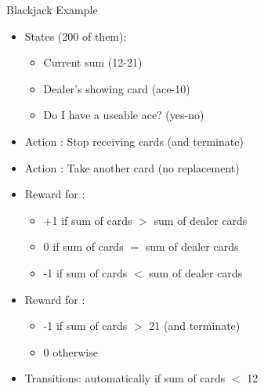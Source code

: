 \bgroup
\begin{frame}{Blackjack Example}
\begin{minipage}{0.7\textwidth}
\begin{itemize}
\item States (200 of them):
\begin{itemize}
\item Current sum (12-21)
\item Dealer's showing card (ace-10)
\item Do I have a useable ace? (yes-no)
\end{itemize}
%
\item Action : Stop receiving cards (and terminate)
\item Action : Take another card (no replacement)
\item Reward for :
\begin{itemize}
\item +1 if sum of cards $>$ sum of dealer cards
\item 0 if sum of cards $=$ sum of dealer cards
\item -1 if sum of cards $<$ sum of dealer cards
\end{itemize}
%
\item Reward for :
\begin{itemize}
\item -1 if sum of cards $>$ 21 (and terminate)
\item 0 otherwise
\end{itemize}
%
\item Transitions: automatically  if sum of cards $<$ 12
\end{itemize}
\end{minipage}
\begin{minipage}{0.25\textwidth}
\begin{figure}
\centering

\end{figure}
\end{minipage}
\end{frame}

